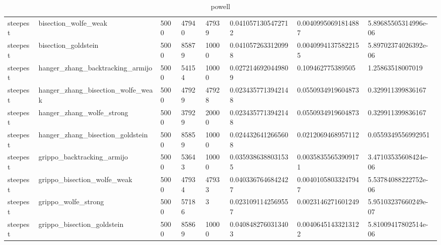 \documentclass[a4paper,11pt]{article}
\numberwithin{equation}{section} %
\begin{document}
\begin{table}[h!]
{\begin{tabular}{|l|l|l|l|l|l|l|l|}
        steepest & bisection\_wolfe\_weak & 5000 & 47940 & 47939 & 0.0410571305472712 & 0.00409950691814887 & 5.89685505314996e-06 \\
        steepest & bisection\_goldstein & 5000 & 85879 & 10000 & 0.0410572633120998 & 0.00409941375822155 & 5.89702374026392e-06 \\
        steepest & hanger\_zhang\_backtracking\_armijo & 5000 & 54154 & 10000 & 0.0272146920449809 & 0.109462775389505 & 1.25863518007019 \\
        steepest & hanger\_zhang\_bisection\_wolfe\_weak & 5000 & 47929 & 47928 & 0.0234357713942148 & 0.0550934919604873 & 0.329911399836167 \\
        steepest & hanger\_zhang\_wolfe\_strong & 5000 & 37929 & 20000 & 0.0234357713942148 & 0.0550934919604873 & 0.329911399836167 \\
        steepest & hanger\_zhang\_bisection\_goldstein & 5000 & 85859 & 10000 & 0.0244326412665608 & 0.0212069468957112 & 0.0559349556992951 \\
        steepest & grippo\_backtracking\_armijo & 5000 & 53643 & 10000 & 0.0359386388031535 & 0.00358355653909171 & 3.47103535608424e-06 \\
        steepest & grippo\_bisection\_wolfe\_weak & 5000 & 47934 & 47933 & 0.0403367646842427 & 0.00401058033247947 & 5.53784088222752e-06 \\
        steepest & grippo\_wolfe\_strong & 5000 & 57186 & 3 & 0.0231091142569557 & 0.0023146271601249 & 5.95103237660249e-07 \\
        steepest & grippo\_bisection\_goldstein & 5000 & 85869 & 10000 & 0.0408482760313403 & 0.00406451433213122 & 5.81009417802514e-06 \\
\end{tabular}}
\caption{powell}
\label{table:powell}
\end{table}
\end{document}
